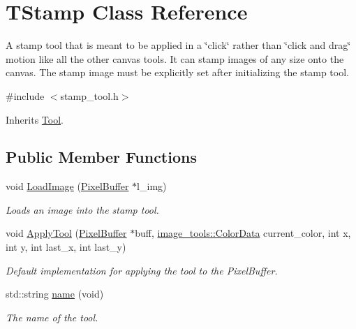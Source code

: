 \hypertarget{classTStamp}{}\section{T\+Stamp Class Reference}
\label{classTStamp}


A stamp tool that is meant to be applied in a \char`\"{}click\char`\"{} rather than \char`\"{}click and drag\char`\"{} motion like all the other canvas tools. It can stamp images of any size onto the canvas. The stamp image must be explicitly set after initializing the stamp tool.  




{\ttfamily \#include $<$stamp\+\_\+tool.\+h$>$}



Inherits \hyperlink{classTool}{Tool}.

\subsection*{Public Member Functions}
\begin{DoxyCompactItemize}
\item 
void \hyperlink{classTStamp_a02436480f92e9ff436209cf6cf4040ed}{Load\+Image} (\hyperlink{classimage__tools_1_1PixelBuffer}{Pixel\+Buffer} $\ast$l\+\_\+img)\hypertarget{classTStamp_a02436480f92e9ff436209cf6cf4040ed}{}\label{classTStamp_a02436480f92e9ff436209cf6cf4040ed}

\begin{DoxyCompactList}\small\item\em Loads an image into the stamp tool. \end{DoxyCompactList}\item 
void \hyperlink{classTStamp_a5588cdf156847144e8e66a5db00be7c2}{Apply\+Tool} (\hyperlink{classimage__tools_1_1PixelBuffer}{Pixel\+Buffer} $\ast$buff, \hyperlink{classimage__tools_1_1ColorData}{image\+\_\+tools\+::\+Color\+Data} current\+\_\+color, int x, int y, int last\+\_\+x, int last\+\_\+y)
\begin{DoxyCompactList}\small\item\em Default implementation for applying the tool to the Pixel\+Buffer. \end{DoxyCompactList}\item 
std\+::string \hyperlink{classTStamp_ac4a470327038c405b42bbf1c76119500}{name} (void)
\begin{DoxyCompactList}\small\item\em The name of the tool. \end{DoxyCompactList}\end{DoxyCompactItemize}
